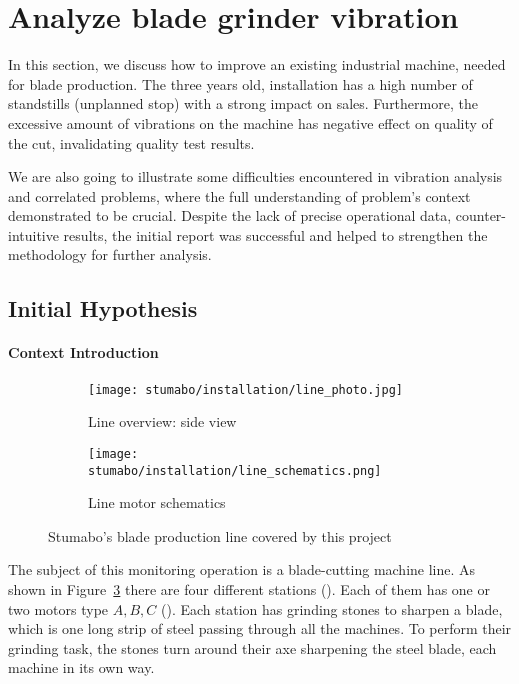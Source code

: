 
\section{Analyze blade grinder vibration}
In this section, we discuss how to improve an existing industrial machine, needed for blade production.
The three years old, installation has a high number of standstills (unplanned stop) with a strong impact on sales.
Furthermore, the excessive amount of vibrations on the machine has negative effect on quality of the cut, invalidating quality test results.

We are also going to illustrate some difficulties encountered in vibration analysis and correlated problems, where 
the full understanding of problem's context demonstrated to be crucial.
Despite the lack of precise operational data, counter-intuitive results, the initial report was successful and helped to strengthen the methodology for further analysis.

\subsection{Initial Hypothesis}
\paragraph{Context Introduction}
\begin{figure}[ht]
    \begin{subfigure}{\textwidth}
        \texttt{[image: stumabo/installation/line\_photo.jpg]}
        \caption{Line overview: side view}
        \label{fig:line_overview}
    \end{subfigure}
    \begin{subfigure}{\textwidth}
        \texttt{[image: stumabo/installation/line\_schematics.png]}
        \caption{Line motor schematics}
        \label{fig:line_schematics}
    \end{subfigure}
    \caption{Stumabo's blade production line covered by this project}
    \label{fig:stumabo_prod_line}
\end{figure}
The subject of this monitoring operation is a blade-cutting machine line.
As shown in Figure~\ref{fig:stumabo_prod_line} there are four different stations (). Each of them has one or two motors type ${A,B,C}$ ().
Each station has grinding stones to sharpen a blade, which is one long strip of steel passing through all the machines.
To perform their grinding task, the stones turn around their axe sharpening the steel blade, each machine in its own way.

